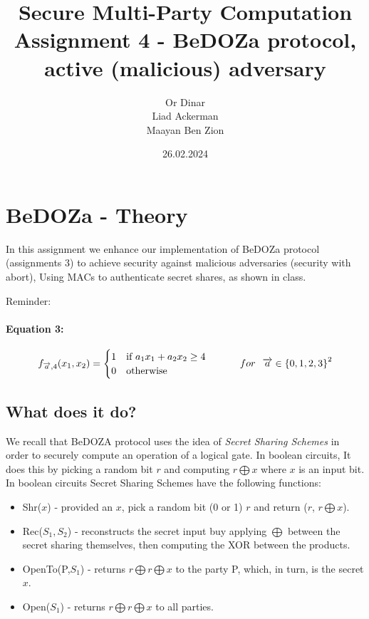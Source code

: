 \documentclass{article}
\title{\textbf{Secure Multi-Party Computation
}Assignment 4 - BeDOZa protocol, active (malicious) adversary\textbf{}}
\author{Or Dinar \\
        Liad Ackerman \\
        Maayan Ben Zion}
\date{26.02.2024}
\begin{document}
\maketitle

\section{BeDOZa - Theory}

In this assignment we enhance our implementation of BeDOZa protocol (assignments 3) to
achieve security against malicious adversaries (security with abort), Using MACs to authenticate secret shares, as shown in class.
\newline

Reminder:
\paragraph{Equation 3:}

$$
f_{\overrightarrow{a},4}(x_{1},x_{2})=\begin{cases}
			1 & \text{if $a_1x_1 + a_2x_2 \geq 4$ }\\
            0 & \text{otherwise}
		 \end{cases} \hspace{1cm} for \hspace{.25cm}  \overrightarrow{a} \in {\left\{ 0,1,2,3\right\}}^{2}
$$



\subsection{What does it do?}
We recall that BeDOZA protocol uses the idea of \textit{Secret Sharing Schemes} in order to securely compute an operation of a logical gate. In boolean circuits, It does this by picking a random bit $r$ and computing $r \bigoplus x$ where $x$ is an input bit. \newline
In boolean circuits Secret Sharing Schemes have the following functions:
\begin{itemize}
  \item Shr($x$) - provided an $x$, pick a random bit (0 or 1) $r$ and return ($r$, $r \bigoplus x$).
  \item Rec($S_1,S_2$) - reconstructs the secret input buy applying $\bigoplus$ between the secret sharing themselves, then computing the XOR between the products.
  \item OpenTo(P,$S_1$) - returns $r\bigoplus r \bigoplus x$ to the party P, which, in turn, is the secret $x$.
  \item Open($S_1$) - returns $r\bigoplus r \bigoplus x$ to all parties.
\end{itemize}
\newpage
\end{document}
